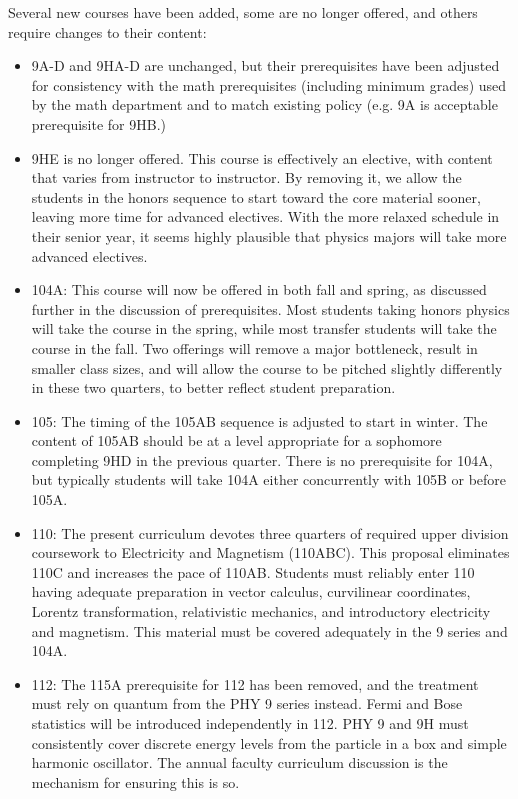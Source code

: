 \documentclass[12pt]{article}
\begin{document}
\vskip 2cm
Several new courses have been added, some are no longer offered, and
others require changes to their content:
\begin{itemize}

\item 9A-D and 9HA-D are unchanged, but their prerequisites have been
  adjusted for consistency with the math prerequisites (including
  minimum grades) used by the math department and to match existing
  policy (e.g. 9A is acceptable prerequisite for 9HB.)

\item 9HE is no longer offered.  This course is effectively an
  elective, with content that varies from instructor to instructor.
  By removing it, we allow the students in the honors sequence to
  start toward the core material sooner, leaving more time for
  advanced electives. With the more relaxed schedule in their senior
  year, it seems highly plausible that physics majors will take more
  advanced electives.

\item 104A: This course will now be offered in both fall and spring,
  as discussed further in the discussion of prerequisites.  Most
  students taking honors physics will take the course in the spring,
  while most transfer students will take the course in the fall.  Two
  offerings will remove a major bottleneck, result in smaller class sizes,
  and will allow the course to be pitched slightly differently in
  these two quarters, to better reflect student preparation.

\item 105: The timing of the 105AB sequence is adjusted to start in
  winter.  The content of 105AB should be at a level appropriate for a
  sophomore completing 9HD in the previous quarter.  There is no prerequisite for
  104A, but typically students will take 104A either concurrently with
  105B or before 105A.

\item 110: The present curriculum devotes three quarters of required
  upper division coursework to Electricity and Magnetism (110ABC).
  This proposal eliminates 110C and increases the pace of 110AB.
  Students must reliably enter 110 having adequate preparation in
  vector calculus, curvilinear coordinates, Lorentz transformation,
  relativistic mechanics, and introductory electricity and magnetism.
  This material must be covered adequately in the 9 series and 104A.

\item 112: The 115A prerequisite for 112 has been removed, and the
  treatment must rely on quantum from the PHY 9 series instead.  Fermi
  and Bose statistics will be introduced independently in 112.  PHY 9
  and 9H must consistently cover discrete energy levels from the
  particle in a box and simple harmonic oscillator.  The annual
  faculty curriculum discussion is the mechanism for ensuring this is
  so.
    

\end{itemize}
\end{document}
